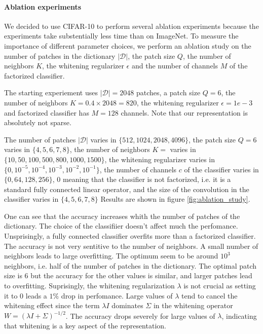 \documentclass{article}
\begin{document}
{\paragraph{Ablation experiments}
We decided to use CIFAR-10 to perform several ablation experiments because the experiments take substentially less time than on ImageNet. To measure the importance of different parameter choices, we perform an ablation study on the number of patches in the dictionary $|\mathcal{D}|$, the patch size $Q$, the number of neighbors $K$, the whitening regularizer $\epsilon$ and the number of channels $M$ of the factorized classifier.

The starting experiement uses  $|\mathcal{D}|=2048$ patches, a patch size $Q=6$, the number of neighbors $K=0.4\times 2048 = 820$, the whitening regularizer $\epsilon=1e-3$ and factorized classifier has $M=128$ channels.
Note that our representation is absolutely not sparse.


The number of patches $|\mathcal{D}|$ varies in $\lbrace 512, 1024, 2048, 4096 \rbrace$, the patch size $Q=6$ varies in $\lbrace 4, 5, 6, 7, 8 \rbrace$, the number of neighbors $K=$ varies in $\lbrace 10, 50, 100, 500, 800, 1000, 1500 \rbrace$, the whitening regularizer varies in $\lbrace0, 10^{-5}, 10^{-4}, 10^{-3}, 10^{-2}, 10^{-1}\rbrace$, the number of channels $c$ of the classifier varies in $\lbrace 0, 64, 128 ,256 \rbrace$, $0$ meaning that the classifier is not factorized, i.e. it is a standard fully connected linear operator, and the size of the convolution in the classifier varies in $\lbrace 4, 5 , 6, 7, 8\rbrace$
Results are shown in figure \ref{fig:ablation_study}.

One can see that the accuracy increases whith the number of patches of the dictionary.
The choice of the classifiier doesn't affect much the perfomance.
Unsprisingly, a fully connected classifier overfits more than a factorized classifier.
The accuracy is not very sentitive to the number of neighbors.
A small number of neighbors leads to large overfitting.
The optimum seem to be around $10^3$ neighbors, i.e. half of the number of patches in the dictionary.
The optimal patch size is $6$ but the accuracy for the other values is similar, and larger patches lead to overfitting.
Suprisingly, the whitening regularization $\lambda$ is not crucial as setting it to $0$ leads a $1\%$ drop in perfomance.
Large values of $\lambda$ tend to cancel the whitening effect since the term $\lambda I$ dominates $\Sigma$ in the whitening operator $W = (\lambda I+\Sigma)^{-1/2}$.
The accuracy drops severely for large values of $\lambda$, indicating that whitening is a key aspect of the representation.

}
\end{document}
